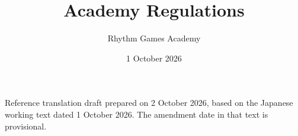\documentclass[
  report,
  fontsize   = 12pt,
  paper      = a4,
  head_space = 20mm,
  foot_space = 20mm,
  gutter     = 20mm,
  fore-edge  = 20mm
]{jlreq}
\title{Academy Regulations}
\author{Rhythm Games Academy}
\date{1 October 2026}
\begin{document}
\maketitle
\noindent Reference translation draft prepared on 2 October 2026, based on the Japanese working text dated 1 October 2026. The amendment date in that text is provisional.
\par\medskip
\translationnotice
\newpage
\tableofcontents
\clearpage










\end{document}
